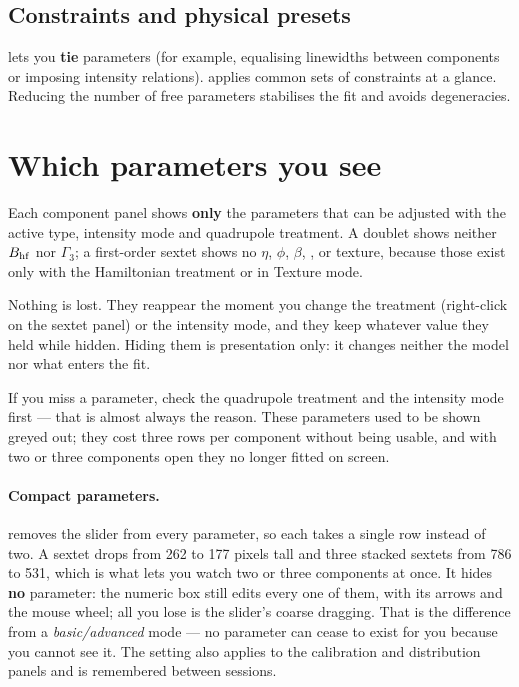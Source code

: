 \subsection{Constraints and physical presets}

 lets you \textbf{tie}
parameters (for example, equalising linewidths between components or imposing
intensity relations).  applies
common sets of constraints at a glance. Reducing the number of free
parameters stabilises the fit and avoids degeneracies.

\section{Which parameters you see}
\label{sec:params-visibles}

Each component panel shows \textbf{only} the parameters that can be adjusted
with the active type, intensity mode and quadrupole treatment. A doublet shows
neither $B_{\mathrm{hf}}$ nor $\Gamma_3$; a first-order sextet shows no $\eta$, $\phi$,
$\beta$, ,  or texture, because those exist only with the
Hamiltonian treatment or in Texture mode.

Nothing is lost. They reappear the moment you change the treatment (right-click
on the sextet panel) or the intensity mode, and they keep whatever value they
held while hidden. Hiding them is presentation only: it changes neither the
model nor what enters the fit.

\begin{truco}
If you miss a parameter, check the quadrupole treatment and the intensity mode
first --- that is almost always the reason. These parameters used to be shown
greyed out; they cost three rows per component without being usable, and with
two or three components open they no longer fitted on screen.
\end{truco}

\paragraph{Compact parameters.}  removes the
slider from every parameter, so each takes a single row instead of two. A sextet
drops from 262 to 177 pixels tall and three stacked sextets from 786 to 531,
which is what lets you watch two or three components at once. It hides
\textbf{no} parameter: the numeric box still edits every one of them, with its
arrows and the mouse wheel; all you lose is the slider's coarse dragging. That
is the difference from a \emph{basic/advanced} mode --- no parameter can cease
to exist for you because you cannot see it. The setting also applies to the
calibration and distribution panels and is remembered between sessions.

